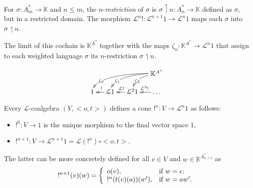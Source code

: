 \documentclass[3p]{elsarticle}
\newcommand{\fL}{\mathcal{L}}    %
\newcommand{\vectproduct}{\times} %
\newcommand{\comp}{\circ}               %
\newcommand{\K}{\mathbb{K}}            %
\newtheorem{lemma}{Lemma}
\begin{document}
%
%
%
%

For $\sigma \colon A^*_{m}\to \K$ and $n\leq m$, the
$n$-\emph{restriction} of $\sigma$ is $\sigma\upharpoonleft n \colon
A^*_{n}\to \K$ defined as $\sigma$, but in a restricted domain. The
morphism $\fL^n! \colon \fL^{n+1}1 \to \fL^n1$ maps each $\sigma$
into $\sigma\upharpoonleft n$.


The limit of this cochain is $\K^{A^*}$ together with the maps
$\zeta_n \colon \K^{A^*} \to \fL^{n}1$ that assign to each weighted
language $\sigma$ its $n$-restriction $\sigma \upharpoonleft n$.

$$\xymatrix@C=12pt@R=12pt{&&& \K^{A^*}\ar@(r,u)[dl]|(0.8){\zeta_2} \ar@(r,u)[dll]|(0.8){\zeta_1} \ar@(r,u)[dlll]|(0.8){\zeta_0}\\
1  & \fL1 \ar[l]_{!}  & \fL^21\ar[l]_{\fL!} & \dots\ar[l]_{\fL^2!}
}$$

\medskip

\noindent Every $\fL$-coalgebra $(V,<o,t>)$ defines a cone $!^{n}
\colon V \to \fL^n 1$ as follows:
\begin{itemize}
\item $!^0 \colon V \to 1$ is the unique morphism to the final vector space
$1$,
\item $!^{n+1} \colon V \to \fL^{n+1}1=\fL(!^{n})\comp <o,t>$.
\end{itemize}
%
%
The latter can be more concretely defined for all $v\in V$ and $w\in
\K^{A^*_{n+1}}$ as
$$!^{n+1}(v)(w)= \left\{%
\begin{array}{ll}
    o(v), & \hbox{if $w=\epsilon$;} \\
    !^n(t(v)(a))(w'), & \hbox{if $w=aw'$.} \\
\end{array}%
\right.$$
%
\end{document}
